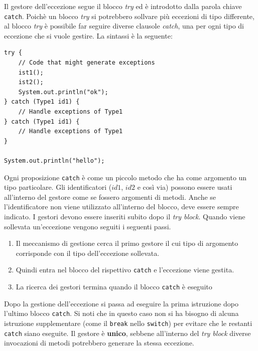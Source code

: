 \documentclass[12pt]{report}
\begin{document}
Il gestore dell'eccezione segue il blocco \textit{try} ed è introdotto dalla parola chiave \texttt{catch}. Poichè un blocco \textit{try} si potrebbero sollvare più eccezioni di tipo differente, al blocco \textit{try} è possibile far seguire diverse clausole \textit{catch}, una per ogni tipo di eccezione che si vuole gestire. La sintassi è la seguente:
\begin{lstlisting}[style=javastyle]
try {
	// Code that might generate exceptions
	ist1();
	ist2();
	System.out.println("ok");
} catch (Type1 id1) {
	// Handle exceptions of Type1
} catch (Type1 id1) {
	// Handle exceptions of Type1
}

System.out.println("hello");
\end{lstlisting}
Ogni proposizione \texttt{catch} è come un piccolo metodo che ha come argomento un tipo particolare. Gli identificatori ($id1$, $id2$ e così via) possono essere usati all'interno del gestore come se fossero argomenti di metodi. Anche se l'identificatore non viene utilizzato all'interno del blocco, deve essere sempre indicato. I gestori devono essere inseriti subito dopo il \textit{try block}. Quando viene sollevata un'eccezione vengono seguiti i seguenti passi.
\begin{enumerate}
	\item Il meccanismo di gestione cerca il primo gestore il cui tipo di argomento corrisponde con il tipo dell'eccezione sollevata.
	\item Quindi entra nel blocco del rispettivo \texttt{catch} e l'eccezione viene gestita.
	\item La ricerca dei gestori termina quando il blocco \texttt{catch} è eseguito
\end{enumerate}

Dopo la gestione dell'eccezione si passa ad eseguire la prima istruzione dopo l'ultimo blocco \texttt{catch}. Si noti che in questo caso  non si ha bisogno di alcuna istruzione supplementare (come il \texttt{break} nello \texttt{switch}) per evitare che le restanti \texttt{catch} siano eseguite. Il gestore è \textbf{unico}, sebbene all'interno del \textit{try block} diverse invocazioni di metodi potrebbero generare la stessa eccezione.
\end{document}
